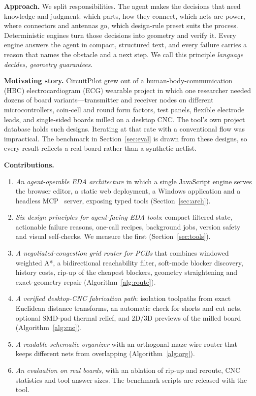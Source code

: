 \documentclass[journal]{IEEEtran}
\begin{document}
\textbf{Approach.} We split responsibilities. The agent makes the decisions that need knowledge and judgment: which parts, how they connect, which nets are power, where connectors and antennas go, which design-rule preset suits the process. Deterministic engines turn those decisions into geometry and verify it. Every engine answers the agent in compact, structured text, and every failure carries a reason that names the obstacle and a next step. We call this principle \emph{language decides, geometry guarantees}.

\textbf{Motivating story.} CircuitPilot grew out of a human-body-communication (HBC) electrocardiogram (ECG) wearable project in which one researcher needed dozens of board variants---transmitter and receiver nodes on different microcontrollers, coin-cell and round form factors, test panels, flexible electrode leads, and single-sided boards milled on a desktop CNC. The tool's own project database holds \ProjectCount{} such designs. Iterating at that rate with a conventional flow was impractical. The benchmark in Section~\ref{sec:eval} is drawn from these designs, so every result reflects a real board rather than a synthetic netlist.

\textbf{Contributions.}
\begin{enumerate}
\item \emph{An agent-operable EDA architecture} in which a single JavaScript engine serves the browser editor, a static web deployment, a Windows application and a headless MCP~\cite{anthropic2024mcp,mcpspec} server, exposing \ToolCount{} typed tools (Section~\ref{sec:arch}).
\item \emph{Six design principles for agent-facing EDA tools}: compact filtered state, actionable failure reasons, one-call recipes, background jobs, version safety and visual self-checks. We measure the first (Section~\ref{sec:tools}).
\item \emph{A negotiated-congestion grid router for PCBs} that combines windowed weighted A*, a bidirectional reachability filter, soft-mode blocker discovery, history costs, rip-up of the cheapest blockers, geometry straightening and exact-geometry repair (Algorithm~\ref{alg:route}).
\item \emph{A verified desktop-CNC fabrication path}: isolation toolpaths from exact Euclidean distance transforms, an automatic check for shorts and cut nets, optional SMD-pad thermal relief, and 2D/3D previews of the milled board (Algorithm~\ref{alg:cnc}).
\item \emph{A readable-schematic organizer} with an orthogonal maze wire router that keeps different nets from overlapping (Algorithm~\ref{alg:org}).
\item \emph{An evaluation on \DesignCount{} real boards}, with an ablation of rip-up and reroute, CNC statistics and tool-answer sizes. The benchmark scripts are released with the tool.
\end{enumerate}
\end{document}
